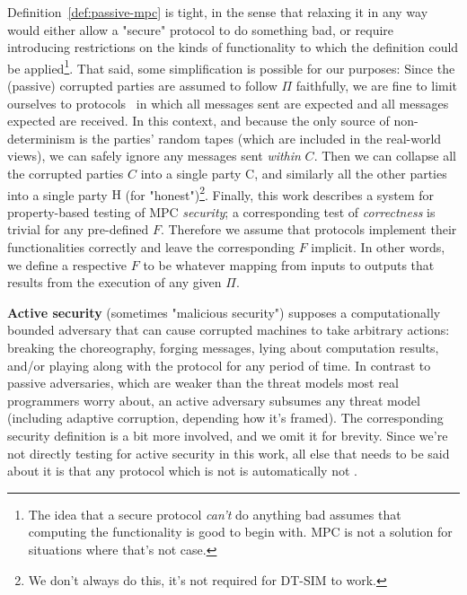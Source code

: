 \documentclass[acmlarge, manuscript, screen, review, anonymous, table]{acmart}
\newcommand{\toolname}{\textsc{DT-SIM}\xspace}
\begin{document}
Definition~\ref{def:passive-mpc} is tight, in the sense that relaxing it in any way would either
allow a "secure" protocol to do something bad, or require introducing restrictions
on the kinds of functionality to which the definition could be applied\footnote{
    The idea that a secure protocol \emph{can't} do anything bad assumes that computing the functionality is good to begin with.
    MPC is not a solution for situations where that's not case.
}.
That said, some simplification is possible for our purposes:
Since the (passive) corrupted parties are assumed to follow $Π$ faithfully, we are fine to limit ourselves to
 protocols~\cite{montesi_2023} in which all messages sent are expected and all messages expected are received.
In this context, and because the only source of non-determinism is the parties' random tapes
(which are included in the real-world views),
we can safely ignore any messages sent \emph{within} $C$.
Then we can collapse all the corrupted parties $C$ into a single party $\mathrm{C}$,
and similarly all the other parties into a single party $\mathrm{H}$ (for "honest")\footnote{
    We don't always do this, it's not required for \toolname to work.
}.
Finally, this work describes a system for property-based testing of MPC \emph{security};
a corresponding test of \emph{correctness} is trivial for any pre-defined $F$.
Therefore we assume that protocols implement their functionalities correctly and leave the corresponding $F$ implicit.
In other words, we define a respective $F$ to be whatever mapping from inputs to outputs that results from the execution of any given $Π$.

\textbf{Active security}
(sometimes "malicious security")
supposes a computationally bounded adversary that can cause corrupted machines to take arbitrary actions:
breaking the choreography,
forging messages,
lying about computation results,
and/or playing along with the protocol for any period of time.
In contrast to passive adversaries, which are weaker than the threat models most real programmers worry about,
an active adversary subsumes any threat model (including adaptive corruption, depending how it's framed).
The corresponding security definition is a bit more involved, and we omit it for brevity.
Since we're not directly testing for active security in this work,
all else that needs to be said about it is that
any protocol which is not  is automatically not .
\end{document}
